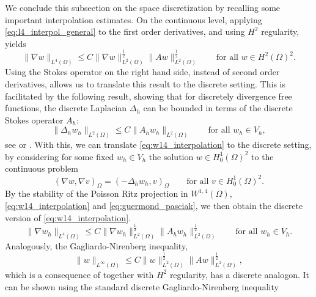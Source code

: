\documentclass{m2an}
\newcommand{\Oprod}[1]{\left( #1 \right)_{\Omega}}
\begin{document}
We conclude this subsection on the space discretization by recalling some important interpolation 
estimates. On the continuous level, applying \eqref{eq:l4_interpol_general} to the first order derivatives,
and using $H^2$ regularity, yields
\begin{equation}\label{eq:w14_interpolation}
  \|\nabla w \|_{L^4(\Omega)} \le C \|\nabla w\|_{L^2(\Omega)}^{\frac{1}{2}}\|A w\|_{L^2(\Omega)}^{\frac{1}{2}}
  \qquad \text{for all } w \in H^2(\Omega)^2.
\end{equation}
Using the Stokes operator on the right hand side, instead of second order derivatives, allows us
to translate this result to the discrete setting. This is facilitated by the following result,
showing that for discretely divergence free functions, the
discrete Laplacian $\Delta_h$ can be bounded in terms of the discrete Stokes operator $A_h$:
\begin{equation}\label{eq:guermond_pasciak}
   \|\Delta_h w_h\|_{L^2(\Omega)} \le C \|A_h w_h \|_{L^2(\Omega)} \qquad \text{for all } w_h \in V_h,
\end{equation}
see \cite[Corollary 4.4]{heywood_finite_1982} or \cite[Lemma 4.1]{guermond_stability_2008}.
With this, we can translate \eqref{eq:w14_interpolation} to the discrete setting,
by considering for some fixed $w_h \in V_h$
the solution $w \in H^1_0(\Omega)^2$ to the continuous problem
\begin{equation*}
\Oprod{\nabla w,\nabla v} = \Oprod{-\Delta_h w_h,v} \qquad \text{for all } v \in H^1_0(\Omega)^2.
\end{equation*}
By the stability of the Poisson Ritz projection in $W^{1,4}(\Omega)$, \eqref{eq:w14_interpolation} and 
\eqref{eq:guermond_pasciak}, we then obtain the discrete version of \eqref{eq:w14_interpolation}.
\begin{equation}\label{eq:discrete_w14_interpolation}
  \|\nabla w_h\|_{L^4(\Omega)} \le 
  C \|\nabla w_h\|_{L^2(\Omega)}^{\frac{1}{2}}\|A_h w_h\|_{L^2(\Omega)}^{\frac{1}{2}}
  \qquad \text{for all } w_h \in V_h.
\end{equation}
Analogously, the Gagliardo-Nirenberg inequality,
\begin{equation}\label{eq:gagliardo_nirenberg}
  \|w\|_{L^\infty(\Omega)} \le C \|w\|_{L^2(\Omega)}^{\frac{1}{2}}\|A w\|_{L^2(\Omega)}^{\frac{1}{2}},
\end{equation}
which is a consequence of \cite[Theorem 3]{adams_cone_1977} together with $H^2$ regularity, has a discrete 
analogon. It can be shown using the standard discrete Gagliardo-Nirenberg inequality
\end{document}
